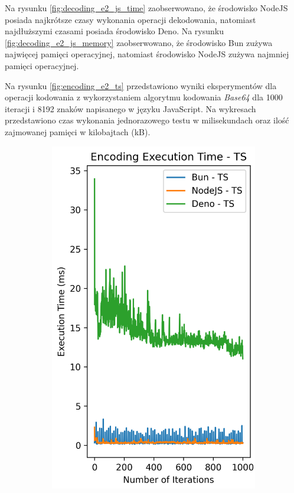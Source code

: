 Na rysunku \ref{fig:decoding_e2_js_time} zaobserwowano, że środowisko NodeJS posiada najkrótsze czasy wykonania operacji dekodowania, natomiast najdłuższymi czasami posiada środowisko Deno. Na rysunku \ref{fig:decoding_e2_js_memory} zaobserwowano, że środowisko Bun zużywa najwięcej pamięci operacyjnej, natomiast środowisko NodeJS zużywa najmniej pamięci operacyjnej.

Na rysunku \ref{fig:encoding_e2_ts} przedstawiono wyniki eksperymentów dla operacji kodowania z wykorzystaniem algorytmu kodowania \textit{Base64} dla 1000 iteracji i 8192 znaków napisanego w języku JavaScript. Na wykresach przedstawiono czas wykonania jednorazowego testu w milisekundach oraz ilość zajmowanej pamięci w kilobajtach (kB).

\begin{figure}[H]
  \centering
  \begin{subfigure}[b]{0.42\textwidth}
    \centering
    \includegraphics[width=\textwidth]{Figures/coding/base64_1000_encoding_ts_time.png}

\end{subfigure}
\end{figure}
